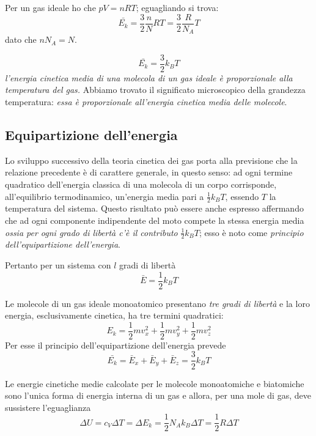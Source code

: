 \documentclass[class=book, crop=false, oneside, 12pt]{standalone}
\begin{document}
Per un gas ideale ho che \(p V = n R T\); eguagliando si trova:
\begin{equation*}
    \bar{E_k} = \frac{3}{2} \frac{n}{N} R T = \frac{3}{2} \frac{R}{N_A} T
\end{equation*}
dato che \(n N_A = N\).

\begin{equation}
    \bar{E_k} = \frac{3}{2} k_B T
\end{equation}
\emph{l'energia cinetica media di una molecola di un gas ideale è proporzionale alla temperatura del gas.}
Abbiamo trovato il significato microscopico della grandezza temperatura: \emph{essa è proporzionale all'energia cinetica media delle molecole}. 

\subsection{Equipartizione dell'energia}
Lo sviluppo successivo della teoria cinetica dei gas porta alla previsione che la relazione precedente è di carattere generale, in questo senso: 
ad ogni termine quadratico dell'energia classica di una molecola di un corpo corrisponde, all'equilibrio termodinamico, un'energia media pari a \(\frac{1}{2} k_B T\), essendo \(T\) la temperatura del sistema. 
Questo risultato può essere anche espresso affermando che ad ogni componente indipendente del moto compete la stessa energia media \emph{ossia per ogni grado di libertà c'è il contributo} \(\frac{1}{2} k_B T\); 
esso è noto come \emph{principio dell'equipartizione dell'energia}. 

Pertanto per un sistema con \(l\) gradi di libertà
\begin{equation}
    \bar{E} = \frac{1}{2} k_B T
\end{equation}

Le molecole di un gas ideale monoatomico presentano \emph{tre gradi di libertà} e la loro energia, esclusivamente cinetica, ha tre termini quadratici:
\begin{equation*}
    E_k = \frac{1}{2} m v_x^2 + \frac{1}{2} m v_y^2 + \frac{1}{2} m v_z^2
\end{equation*}
Per esse il principio dell'equipartizione dell'energia prevede 
\begin{equation*}
    \bar{E_k} = \bar{E}_x + \bar{E}_y + \bar{E}_z = \frac{3}{2} k_B T
\end{equation*}

Le energie cinetiche medie calcolate per le molecole monoatomiche e biatomiche sono l'unica forma di energia interna di un gas e allora, per una mole di gas, deve sussistere l'eguaglianza
\begin{equation*}
    \Delta U = c_V \Delta T = \Delta E_k = \frac{1}{2} N_A k_B \Delta T = \frac{1}{2} R \Delta T
\end{equation*}
\end{document}
